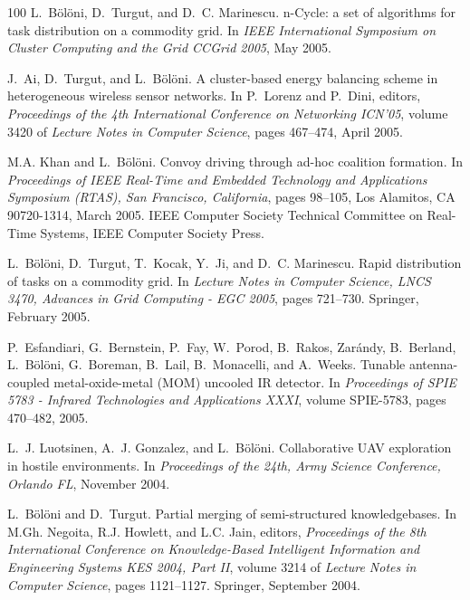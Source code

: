 \begin{thebibliography}{100}
L.~Bölöni, D.~Turgut, and D.~C. Marinescu.
\newblock n-{C}ycle: a set of algorithms for task distribution on a commodity
  grid.
\newblock In {\em IEEE International Symposium on Cluster Computing and the
  Grid CCGrid 2005}, May 2005.

J.~Ai, D.~Turgut, and L.~Bölöni.
\newblock A cluster-based energy balancing scheme in heterogeneous wireless
  sensor networks.
\newblock In P.~Lorenz and P.~Dini, editors, {\em Proceedings of the 4th
  International Conference on Networking ICN'05}, volume 3420 of {\em Lecture
  Notes in Computer Science}, pages 467--474, April 2005.

M.A. Khan and L.~Bölöni.
\newblock Convoy driving through ad-hoc coalition formation.
\newblock In {\em Proceedings of IEEE Real-Time and Embedded Technology and
  Applications Symposium (RTAS), San Francisco, California}, pages 98--105, Los
  Alamitos, CA 90720-1314, March 2005. IEEE Computer Society Technical
  Committee on Real-Time Systems, IEEE Computer Society Press.

L.~Bölöni, D.~Turgut, T.~Kocak, Y.~Ji, and D.~C. Marinescu.
\newblock Rapid distribution of tasks on a commodity grid.
\newblock In {\em Lecture Notes in Computer Science, LNCS 3470, Advances in
  Grid Computing - EGC 2005}, pages 721--730. Springer, February 2005.

P.~Esfandiari, G.~Bernstein, P.~Fay, W.~Porod, B.~Rakos, Zar{\'a}ndy,
  B.~Berland, L.~Bölöni, G.~Boreman, B.~Lail, B.~Monacelli, and A.~Weeks.
\newblock Tunable antenna-coupled metal-oxide-metal ({MOM}) uncooled {IR}
  detector.
\newblock In {\em Proceedings of SPIE 5783 - Infrared Technologies and
  Applications XXXI}, volume SPIE-5783, pages 470--482, 2005.

L.~J. Luotsinen, A.~J. Gonzalez, and L.~Bölöni.
\newblock Collaborative {UAV} exploration in hostile environments.
\newblock In {\em Proceedings of the 24th, Army Science Conference, Orlando
  FL}, November 2004.

L.~Bölöni and D.~Turgut.
\newblock Partial merging of semi-structured knowledgebases.
\newblock In M.Gh. Negoita, R.J. Howlett, and L.C. Jain, editors, {\em
  Proceedings of the 8th International Conference on Knowledge-Based
  Intelligent Information and Engineering Systems KES 2004, Part II}, volume
  3214 of {\em Lecture Notes in Computer Science}, pages 1121--1127. Springer,
  September 2004.


\end{thebibliography}
